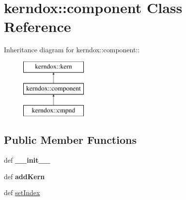 \hypertarget{classkerndox_1_1component}{
\section{kerndox::component Class Reference}
\label{classkerndox_1_1component}
}
Inheritance diagram for kerndox::component::\begin{figure}[H]
\begin{center}
\leavevmode
\includegraphics[height=3cm]{classkerndox_1_1component}
\end{center}
\end{figure}
\subsection*{Public Member Functions}
\begin{CompactItemize}
\item 
\hypertarget{classkerndox_1_1component_ed769a067da36c55d8320c84e17b05aa}{
def \textbf{\_\-\_\-init\_\-\_\-}}
\label{classkerndox_1_1component_ed769a067da36c55d8320c84e17b05aa}

\item 
\hypertarget{classkerndox_1_1component_efee2639f6de0fe2abbc3cabb1128ee5}{
def \textbf{addKern}}
\label{classkerndox_1_1component_efee2639f6de0fe2abbc3cabb1128ee5}

\item 
def \hyperlink{classkerndox_1_1component_9ccd80184cbfcf0d09da6f30a3f807ea}{setIndex}
\end{CompactItemize}
